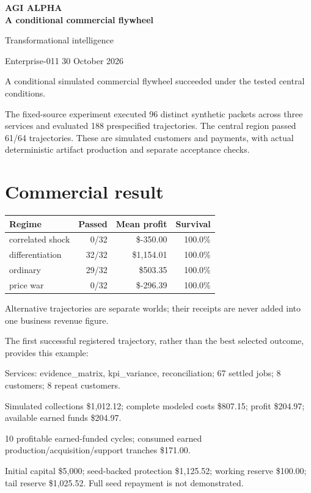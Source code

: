 \documentclass[10pt]{article}
\begin{document}
{\LARGE\bfseries\color{accent} AGI ALPHA\\[4pt] A conditional commercial flywheel}\par
{\large Transformational intelligence}\par
Enterprise-011 \hfill 30 October 2026\par\medskip
A conditional simulated commercial flywheel succeeded under the tested central conditions.

The fixed-source experiment executed 96 distinct synthetic packets across three services and evaluated 188 prespecified trajectories. The central region passed 61/64 trajectories. These are simulated customers and payments, with actual deterministic artifact production and separate acceptance checks.

\section*{Commercial result}
\begin{center}\small\begin{tabular}{lrrr}\toprule Regime & Passed & Mean profit & Survival \\\midrule
correlated shock & 0/32 & \$-350.00 & 100.0\% \\
differentiation & 32/32 & \$1,154.01 & 100.0\% \\
ordinary & 29/32 & \$503.35 & 100.0\% \\
price war & 0/32 & \$-296.39 & 100.0\% \\
\bottomrule\end{tabular}\end{center}
Alternative trajectories are separate worlds; their receipts are never added into one business revenue figure.

The first successful registered trajectory, rather than the best selected outcome, provides this example:

Services: evidence\_matrix, kpi\_variance, reconciliation; 67 settled jobs; 8 customers; 8 repeat customers.

Simulated collections \$1,012.12; complete modeled costs \$807.15; profit \$204.97; available earned funds \$204.97.

10 profitable earned-funded cycles; consumed earned production/acquisition/support tranches \$171.00.

Initial capital \$5,000; seed-backed protection \$1,125.52; working reserve \$100.00; tail reserve \$1,025.52. Full seed repayment is not demonstrated.
\end{document}
